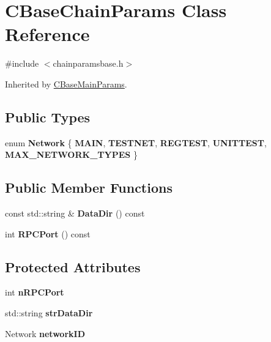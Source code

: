 \hypertarget{class_c_base_chain_params}{}\section{C\+Base\+Chain\+Params Class Reference}
\label{class_c_base_chain_params}


{\ttfamily \#include $<$chainparamsbase.\+h$>$}



Inherited by \mbox{\hyperlink{class_c_base_main_params}{C\+Base\+Main\+Params}}.

\subsection*{Public Types}
\begin{DoxyCompactItemize}
\item 
\mbox{\label{class_c_base_chain_params_a19fb46b499c21801c0ff3c8607a0994e}} 
enum {\bfseries Network} \{ \newline
{\bfseries M\+A\+IN}, 
{\bfseries T\+E\+S\+T\+N\+ET}, 
{\bfseries R\+E\+G\+T\+E\+ST}, 
{\bfseries U\+N\+I\+T\+T\+E\+ST}, 
\newline
{\bfseries M\+A\+X\+\_\+\+N\+E\+T\+W\+O\+R\+K\+\_\+\+T\+Y\+P\+ES}
 \}
\end{DoxyCompactItemize}
\subsection*{Public Member Functions}
\begin{DoxyCompactItemize}
\item 
\mbox{\label{class_c_base_chain_params_a4b142e94ae27f860522dd5efef41fb67}} 
const std\+::string \& {\bfseries Data\+Dir} () const
\item 
\mbox{\label{class_c_base_chain_params_a790801bda78d70db56da89ca43934a63}} 
int {\bfseries R\+P\+C\+Port} () const
\end{DoxyCompactItemize}
\subsection*{Protected Attributes}
\begin{DoxyCompactItemize}
\item 
\mbox{\label{class_c_base_chain_params_ae020d8f669175bcac3ab44f9c095c977}} 
int {\bfseries n\+R\+P\+C\+Port}
\item 
\mbox{\label{class_c_base_chain_params_af5868778f8c6c676aabc9fb2366d2447}} 
std\+::string {\bfseries str\+Data\+Dir}
\item 
\mbox{\label{class_c_base_chain_params_af638f3eb624a21ce7ad76ae320f1f650}} 
Network {\bfseries network\+ID}
\end{DoxyCompactItemize}


